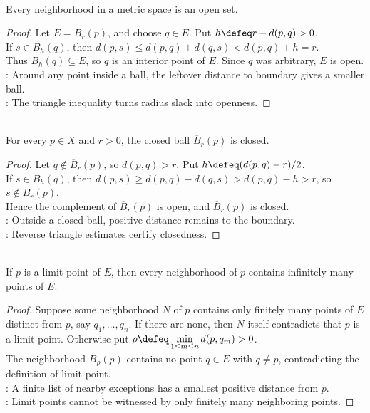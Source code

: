 \begin{theorem} \label{thm:every-neighborhood-open} \\
Every neighborhood in a metric space is an open set.
\begin{proof}
Let $E=B_r(p)$, and choose $q\in E$. Put $h\defeq r-d(p,q)>0$.\\
If $s\in B_h(q)$, then $d(p,s)\leq d(p,q)+d(q,s)<d(p,q)+h=r$.\\
Thus $B_h(q)\subseteq E$, so $q$ is an interior point of $E$. Since $q$ was arbitrary, $E$ is open.\\
: Around any point inside a ball, the leftover distance to boundary gives a smaller ball.\\
: The triangle inequality turns radius slack into openness.
\end{proof}
\end{theorem}

\begin{corollary} \label{cor:closed-balls-are-closed} \\
For every $p\in X$ and $r>0$, the closed ball $\overline{B}_r(p)$ is closed.
\begin{proof}
Let $q\notin\overline{B}_r(p)$, so $d(p,q)>r$. Put $h\defeq(d(p,q)-r)/2$.\\
If $s\in B_h(q)$, then $d(p,s)\geq d(p,q)-d(q,s)>d(p,q)-h>r$, so $s\notin\overline{B}_r(p)$.\\
Hence the complement of $\overline{B}_r(p)$ is open, and $\overline{B}_r(p)$ is closed.\\
: Outside a closed ball, positive distance remains to the boundary.\\
: Reverse triangle estimates certify closedness.
\end{proof}
\end{corollary}

\begin{theorem} \label{thm:limit-point-neighborhoods-infinitely-many} \\
If $p$ is a limit point of $E$, then every neighborhood of $p$ contains infinitely many points of $E$.
\begin{proof}
Suppose some neighborhood $N$ of $p$ contains only finitely many points of $E$ distinct from $p$, say $q_1,\ldots,q_n$. If there are none, then $N$ itself contradicts that $p$ is a limit point. Otherwise put $\rho\defeq\min\limits_{1\leq m\leq n}d(p,q_m)>0$.\\
The neighborhood $B_\rho(p)$ contains no point $q\in E$ with $q\neq p$, contradicting the definition of limit point.\\
: A finite list of nearby exceptions has a smallest positive distance from $p$.\\
: Limit points cannot be witnessed by only finitely many neighboring points.
\end{proof}
\end{theorem}

